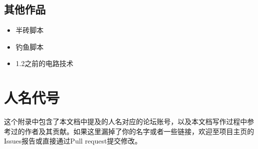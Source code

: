 \section{其他作品}
\begin{itemize}
\item {} 半砖脚本 
\item {} 钓鱼脚本 
\item {} 1.2之前的电路技术 
\end{itemize}

\chapter{人名代号}
这个附录中包含了本文档中提及的人名对应的论坛账号，以及本文档写作过程中参考过的作者及其贡献。如果这里漏掉了你的名字或者一些链接，欢迎至项目主页的Issues报告或直接通过Pull request提交修改。
